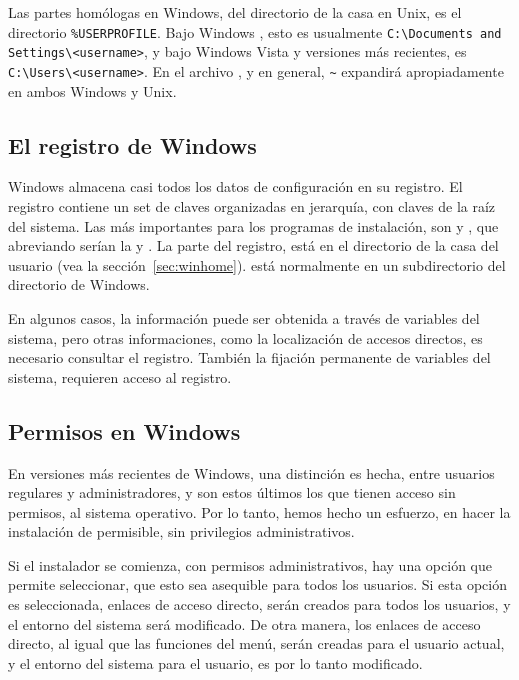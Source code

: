 \documentclass{article}
\begin{document}
Las partes homólogas en Windows, del directorio de la casa en Unix, es el
directorio \verb|%USERPROFILE|. Bajo Windows , esto es usualmente
\verb|C:\Documents and Settings\<username>|, y bajo Windows Vista y
versiones más recientes, es \verb|C:\Users\<username>|. En el archivo
, y \KPS{} en general, \verb|~| expandirá
apropiadamente en ambos Windows y Unix. 

\subsection{El registro de Windows}
\label{sec:registry}

Windows almacena casi todos los datos de configuración en su registro. El
registro contiene un set de claves organizadas en jerarquía, con claves de
la raíz del sistema. Las más importantes para los programas de
instalación, son  y , que
abreviando serían la  y . La parte  del
registro, está en el directorio de la casa del usuario (vea la
sección~\ref{sec:winhome}).  está normalmente en un
subdirectorio del directorio de Windows.

En algunos casos, la información puede ser obtenida a través de variables
del sistema, pero otras informaciones, como la localización de accesos
directos, es necesario consultar el registro. También la fijación
permanente de variables del sistema, requieren acceso al registro.

\subsection{Permisos en Windows}
\label{sec:winpermissions}

En versiones más recientes de Windows, una distinción es hecha, entre
usuarios regulares y administradores, y son estos últimos los que tienen
acceso sin permisos, al sistema operativo. Por lo tanto, hemos hecho un
esfuerzo, en hacer la instalación de \TL{} permisible, sin privilegios
administrativos. 

Si el instalador se comienza, con permisos administrativos, hay una
opción que permite seleccionar, que esto sea asequible para todos los
usuarios. Si esta opción es seleccionada, enlaces de acceso directo,
serán creados para todos los usuarios, y el entorno del sistema será
modificado. De otra manera, los enlaces de acceso directo, al igual
que las funciones del menú, serán creadas para el usuario actual, y el
entorno del sistema para el usuario, es por lo tanto modificado. 
\end{document}
